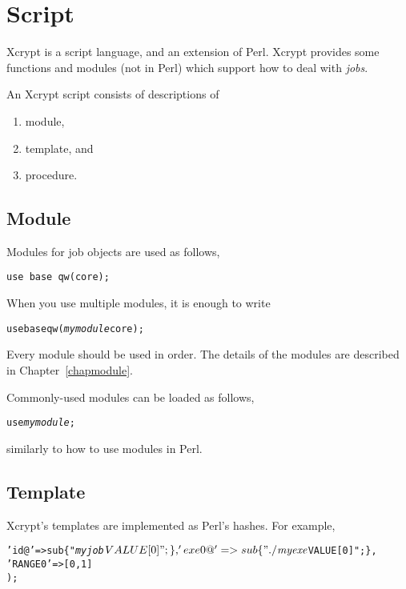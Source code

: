 \documentclass[a4paper,10pt]{report}
\begin{document}
\chapter{Script}

Xcrypt is a script language, and an extension of Perl.  Xcrypt provides
some functions and modules (not in Perl) which support how to deal
with \textit{jobs}.

An Xcrypt script consists of descriptions of
\begin{enumerate}
 \item module,
 \item template, and
 \item procedure.
\end{enumerate}

\section{Module}

Modules for job objects are used as follows,
\begin{boxnote}
\begin{verbatim}
use base qw(core);
\end{verbatim}
\end{boxnote}
\vspace{\baselineskip}

When you use multiple modules, it is enough to write
\begin{boxnote}
\begin{alltt}
use base qw(\textit{mymodule} core);
\end{alltt}
\end{boxnote}
\vspace{\baselineskip}
\noindent
Every module should be used in order.
The details of the modules are described in Chapter~\ref{chapmodule}.

Commonly-used modules can be loaded as follows,
\begin{boxnote}
\begin{alltt}
use \textit{mymodule};
\end{alltt}
\end{boxnote}
\vspace{\baselineskip}
\noindent
similarly to how to use modules in Perl.

\section{Template}

Xcrypt's templates are implemented as Perl's hashes.  For example,
\begin{boxnote}
\begin{alltt}
%mytemplate = (
 'id@' => sub \{ "\textit{myjob}$VALUE[0]"; \},
 'exe0@' => sub \{ "./\textit{myexe} $VALUE[0]"; \},
 'RANGE0' => [0,1]
);
\end{alltt}
\end{boxnote}
\vspace{\baselineskip}
\end{document}
